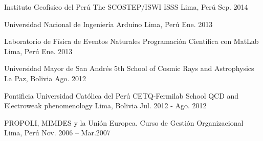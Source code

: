 
\begin{cventries}

  \cventry
    {Instituto Geofísico del Perú} %
    {The SCOSTEP/ISWI ISSS} %
    {Lima, Perú} %
    {Sep. 2014} %
    {}

  \cventry
    {Universidad Nacional de Ingeniería} %
    {Arduino} %
    {Lima, Perú} %
    {Ene. 2013} %
    {}

  \cventry
    {Laboratorio de Física de Eventos Naturales} %
    {Programación Científica con MatLab} %
    {Lima, Perú} %
    {Ene. 2013} %
    {}

  \cventry
    {Universidad Mayor de San Andrés} %
    {5th School of Cosmic Rays and Astrophysics} %
    {La Paz, Bolivia} %
    {Ago. 2012} %
    {}

  \cventry
    {Pontificia Universidad Católica del Perú} %
    {CETQ-Fermilab School QCD and Electroweak phenomenology} %
    {Lima, Bolivia} %
    {Jul. 2012 - Ago. 2012} %
    {}

  \cventry
    {PROPOLI, MIMDES y la Unión Europea.} %
    {Curso de Gestión Organizacional} %
    {Lima, Perú} %
    {Nov. 2006 – Mar.2007} %
    {}

\end{cventries}
